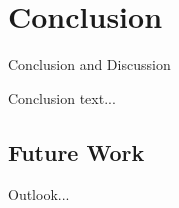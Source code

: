 \chapter{Conclusion} \label{chap:conclusion}

Conclusion and Discussion

Conclusion text...

\section{Future Work} \label{sec:future_work}
Outlook...